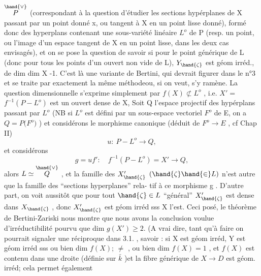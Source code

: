 
$\overset{\hand{\vee}}{P}$ (correspondant à la question d'étudier les sections hypérplanes de X
passant par un point donné x, ou tangent à X en un point lisse donné),
formé donc des hyperplans contenant une sous-variété linéaire $L^{o}$ de P
(resp. un point,  ou l'image d'un espace tangent de X en un point lisse,
dans les deux cas envisagés), et on se pose la question de savoir si
pour le point générique \hand{$\zeta$} de L  (donc pour tous les points d'un ouvert
non vide de L),  $Y_{\hand{\zeta}}$  est  géom irréd., de
\placedmargin{/} dim  dim X -1.   C'est là une variante  de Bertini, qui devrait figurer
dans  le n°3  et se traite par exactement la même méthodeou, si on veut, s'y ramène.  La question
dimensionnelle s'exprime simplement par  $f(X)\not\subset L^{o}$ , 
i.e.  $X' =$  $f^{-1}(P - L^{o})$   est un ouvert dense de X, 
Soit Q l'espace projectif des hypérplans passant par $L^{o}$  (NB si  $L^{o}$ est
défini par un sous-espace vectoriel $F^{o}$ de E,  on a   $Q = P($$F^{o})$ ) et
considérons le morphisme  canonique  (déduit de  $F^{o}\longrightarrow E$ , cf
Chap II)
\[ u :\ P - L^{o} \longrightarrow Q, \]
et considérons
\[ g = u f' :\quad f^{-1}(P - L^{o}) = X' \longrightarrow Q , \]
alors   $L \simeq \overset{\hand{\vee}}{Q}$ ,  et la famille des
$X'_{\hand{\zeta}}$  $(\hand{\zeta}\hand{\in} L)$  n'est autre que la famille des ``sections hyperplanes'' rela-%
tif à ce morphisme  g . D'autre part, on voit aussitôt que pour tout
$\hand{\zeta}\in L$  ``général''  $X'_{\hand{\zeta}}$ est dense dans $X_{\hand{\zeta}}$ , donc  $X'_{\hand{\zeta}}$  est géom irréd sss
X  l'est.  Ceci posé,  le théorème de Bertini-Zariski nous montre que
nous avons la conclusion voulue  d'irréductibilité pourvu que
dim $g(X') \geqslant 2$. (A vrai dire, tant qu'à faire on pourrait signaler une
réciproque dans 3.1. , savoir :  si X est géom irréd, Y  est
géom irréd sss  ou bien  dim $f(X)$; $\neq$ , ou bien  dim $f(X)=1$ , et $f(X)$
est contenu dans une droite (définie sur $\bar{k}$ )et la fibre générique de $X\to D$ est géom. irréd\hand{)}; cela permet également


